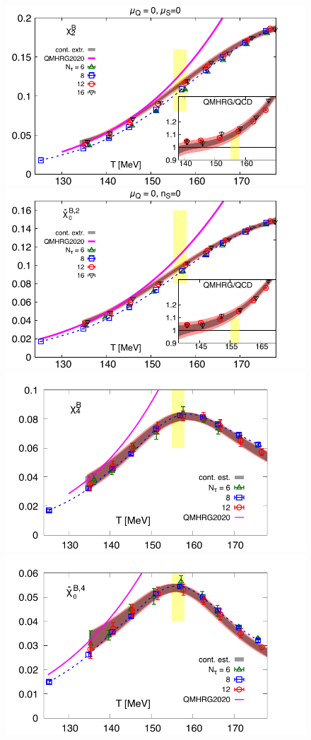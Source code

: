 \documentclass[pdflatex,prd,twocolumn,showpacs,superscriptaddress,nofootinbib]{revtex4-1}
\begin{document}
\begin{figure}[ht]
\includegraphics[scale=0.54]{fig/BQS200_multiplot.pdf}
\includegraphics[scale=0.54]{fig/P2_r05_multiplot.pdf}
\includegraphics[scale=0.54]{fig/BQS400.pdf}
\includegraphics[scale=0.54]{fig/P4_r05.pdf}

\end{figure}
\end{document}
